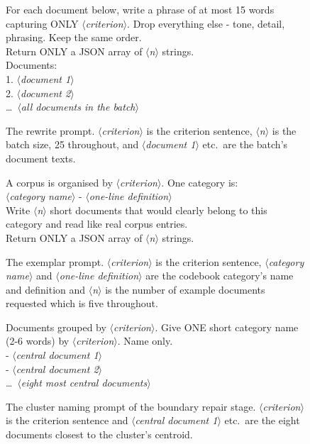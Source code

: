 \documentclass[11pt,a4paper,oneside]{report}
\newcommand{\ph}[1]{\textcolor{blue!60!black}{\rmfamily\itshape $\langle$#1$\rangle$}}
\begin{document}
\begin{figure}[htbp]
\begin{promptbox}
\small\ttfamily
For each document below, write a phrase of at most 15 words capturing ONLY \ph{criterion}. Drop everything else - tone, detail, phrasing. Keep the same order.\\
Return ONLY a JSON array of \ph{n} strings.\\[4pt]
Documents:\\
1. \ph{document 1}\\
2. \ph{document 2}\\
\ldots\ \ph{all documents in the batch}
\end{promptbox}
\caption[Rewrite prompt]{The rewrite prompt. \ph{criterion} is the criterion sentence, \ph{n} is the batch size, 25 throughout, and \ph{document 1} etc.\ are the batch's document texts.}
\label{fig:prompt-rewrite}
\end{figure}

\begin{figure}[htbp]
\begin{promptbox}
\small\ttfamily
A corpus is organised by \ph{criterion}. One category is:\\
\ph{category name} - \ph{one-line definition}\\[4pt]
Write \ph{n} short documents that would clearly belong to this category and read like real corpus entries.\\
Return ONLY a JSON array of \ph{n} strings.
\end{promptbox}
\caption[Exemplar prompt]{The exemplar prompt. \ph{criterion} is the criterion sentence, \ph{category name} and \ph{one-line definition} are the codebook category's name and definition and \ph{n} is the number of example documents requested which is five throughout.}
\label{fig:prompt-exemplar}
\end{figure}

\begin{figure}[htbp]
\begin{promptbox}
\small\ttfamily
Documents grouped by \ph{criterion}. Give ONE short category name (2-6 words) by \ph{criterion}. Name only.\\[4pt]
- \ph{central document 1}\\
- \ph{central document 2}\\
\ldots\ \ph{eight most central documents}
\end{promptbox}
\caption[Cluster naming prompt]{The cluster naming prompt of the boundary repair stage. \ph{criterion} is the criterion sentence and \ph{central document 1} etc.\ are the eight documents closest to the cluster's centroid.}
\label{fig:prompt-name}
\end{figure}
\end{document}
